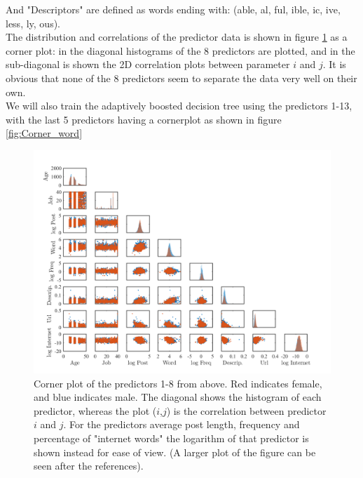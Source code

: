 \documentclass[a4paper,11pt]{article}
\begin{document}
\noindent And "Descriptors" are defined as words ending with\cite{other}:
(able, al, ful, ible, ic, ive, less, ly, ous).\\

\noindent The distribution and correlations of the predictor data is shown in figure \ref{fig:DataDistributions} as a corner plot: in the diagonal histograms of the 8 predictors are plotted, and in the sub-diagonal is shown the 2D correlation plots between parameter $i$ and $j$. It is obvious that none of the 8 predictors seem to separate the data very well on their own.\\

\noindent We will also train the adaptively boosted decision tree using the predictors 1-13, with the last 5 predictors having a cornerplot as shown in figure \ref{fig:Corner_word}
\FloatBarrier
\begin{figure}[h!]
    \centerline{\includegraphics[width=1.2\textwidth]{Pix/Corner.png}}
    \caption{Corner plot of the predictors 1-8 from above. Red indicates female, and blue indicates male. The diagonal shows the histogram of each predictor, whereas the plot ($i$,$j$) is the correlation between predictor $i$ and $j$. For the predictors average post length, frequency and percentage of "internet words" the logarithm of that predictor is shown instead for ease of view. (A larger plot of the figure can be seen after the references).}
    \label{fig:DataDistributions}
   	\vspace{-1em}
\end{figure}
\end{document}
